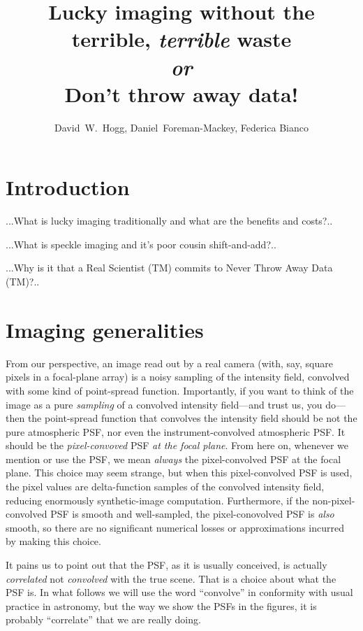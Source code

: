 \documentclass[12pt,preprint]{aastex}
\title{Lucky imaging without the terrible, \emph{terrible} waste\\
       \textit{or}\\
       Don't throw away data!}
\author{
  David~W.~Hogg\altaffilmark{\ref{CCPP},\ref{MPIA},\ref{email}},
  Daniel~Foreman-Mackey\altaffilmark{\ref{CCPP}},
  Federica Bianco\altaffilmark{\ref{CCPP},\ref{LCOGT}}
}
\begin{document}
\section{Introduction}

...What is lucky imaging traditionally and what are the benefits and costs?..

...What is speckle imaging and it's poor cousin shift-and-add?..

...Why is it that a Real Scientist (TM) commits to Never Throw Away Data (TM)?..

\section{Imaging generalities}

From our perspective, an image read out by a real camera (with, say,
square pixels in a focal-plane array) is a noisy sampling of the
intensity field, convolved with some kind of point-spread function.
Importantly, if you want to think of the image as a pure
\emph{sampling} of a convolved intensity field---and trust us, you
do---then the point-spread function that convolves the intensity field
should be not the pure atmospheric PSF, nor even the
instrument-convolved atmospheric PSF.  It should be the
\emph{pixel-convoved} PSF \emph{at the focal plane}.  From here on,
whenever we mention or use the PSF, we mean \emph{always} the
pixel-convolved PSF at the focal plane.  This choice may seem strange,
but when this pixel-convolved PSF is used, the pixel values are
delta-function samples of the convolved intensity field, reducing
enormously synthetic-image computation.  Furthermore, if the
non-pixel-convolved PSF is smooth and well-sampled, the
pixel-conovolved PSF is \emph{also} smooth, so there are no significant
numerical losses or approximations incurred by making this choice.

It pains us to point out that the PSF, as it is usually conceived, is
actually \emph{correlated} not \emph{convolved} with the true scene.
That is a choice about what the PSF is.  In what follows we will use
the word ``convolve'' in conformity with usual practice in astronomy,
but the way we show the PSFs in the figures, it is probably
``correlate'' that we are really doing.
\end{document}
